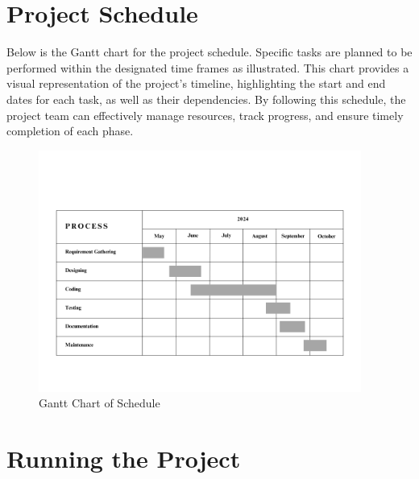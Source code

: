 \section{Project Schedule}
Below is the Gantt chart for the project schedule. Specific tasks are planned to be performed within the designated time frames as illustrated. This chart provides a visual representation of the project's timeline, highlighting the start and end dates for each task, as well as their dependencies. By following this schedule, the project team can effectively manage resources, track progress, and ensure timely completion of each phase.
\begin{figure}[H]
    \centering
        \includegraphics[width=400px]{Diagrams/Gantt_Chart.png}
    \caption{Gantt Chart of Schedule}
\end{figure}
\section{Running the Project}

